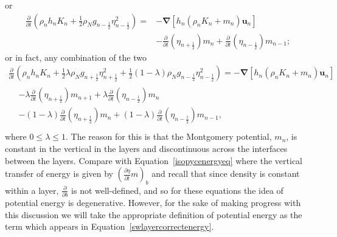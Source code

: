 \documentclass[12pt,a4paper]{report}
\newcommand*\equref[1]{Equation~\eqref{#1}}
\newcommand*{\half}{\frac{1}{2}}
\begin{document}
    or
    \begin{equation}
    \begin{split}
    \frac{\partial}{\partial t}\left(\rho_{n}h_{n} K_{n}+ 
    \half \rho_{N} g_{n-\half }\eta_{n-\half }^{2} \right) 
    =& -\boldsymbol{\nabla} \left[h_{n} \left(\rho_{n}K_{n}+m_{n}\right) \boldsymbol{u}_{n}\right] \\
    &- \frac{\partial}{\partial t}\left(\eta_{n+\half }\right)   m_{n}
    + \frac{\partial}{\partial t}\left(\eta_{n-\half }\right) m_{n-1};
    \end{split}
    \end{equation}
    or in fact, any combination of the two
    \begin{equation}
    \begin{split}
    \frac{\partial}{\partial t}\left(\rho_{n}h_{n} K_{n}+ 
    \half \lambda\rho_{N} g_{n+\half }\eta_{n+\half }^{2}  +
    \half \left(1-\lambda\right)\rho_{N} g_{n-\half }\eta_{n-\half }^{2} \right) 
    = -\boldsymbol{\nabla} \left[h_{n} \left(\rho_{n}K_{n}+m_{n}\right) \boldsymbol{u}_{n}\right] \\
    \begin{split}
    &- \lambda\frac{\partial}{\partial t}\left(\eta_{n+\half }\right)   m_{n+1}
    + \lambda\frac{\partial}{\partial t}\left(\eta_{n-\half }\right) m_{n} \\
    &- \left(1-\lambda\right)\frac{\partial}{\partial t}\left(\eta_{n+\half }\right)   m_{n}
    + \left(1-\lambda\right)\frac{\partial}{\partial t}\left(\eta_{n-\half }\right) m_{n-1}, \\
    \end{split}
    \end{split}
    \label{swlayergradedenergy}
    \end{equation}
    where $0 \leq \lambda \leq 1$. The reason for this is that the Montgomery potential,
    $m_{n}$, is constant in the vertical in the layers and discontinuous across the interfaces between the layers. Compare with \equref{isopycenergyeq} where the 
    vertical transfer of energy is given by 
    $\left(\frac{\partial \eta}{\partial t} m \right)_{b}$ and recall that since density is
     constant within a layer, $\frac{\partial }{\partial b}$ is not well-defined, and so for
      these equations the idea of potential energy is degenerative. However,
      for the sake of making progress with this discussion we will take the
      appropriate definition of potential energy as the term which appears in \equref{swlayercorrectenergy}.
    
\end{document}
